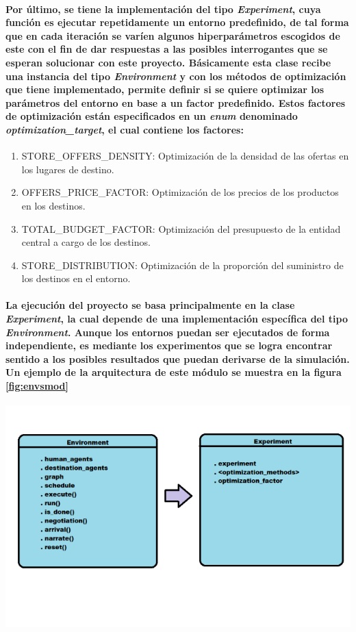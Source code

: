 \documentclass[12pt]{amsart}
\begin{document}
\paragraph{Por último, se tiene la implementación del tipo \textit{Experiment}, cuya función es ejecutar repetidamente un entorno predefinido, de tal forma que en cada iteración se varíen algunos hiperparámetros escogidos de este con el fin de dar respuestas a las posibles interrogantes que se esperan solucionar con este proyecto. Básicamente esta clase recibe una instancia del tipo \textit{Environment} y con los métodos de optimización que tiene implementado, permite definir si se quiere optimizar los parámetros del entorno en base a un factor predefinido. Estos factores de optimización están especificados en un \textit{enum} denominado \textit{optimization\_target}, el cual contiene los factores:} 
\begin {enumerate}
				\item {STORE\_OFFERS\_DENSITY: Optimización de la densidad de las ofertas en los lugares de destino.}
				\item {OFFERS\_PRICE\_FACTOR: Optimización de los precios de los productos en los destinos.}
				\item {TOTAL\_BUDGET\_FACTOR: Optimización del presupuesto de la entidad central a cargo de los destinos.}
				\item {STORE\_DISTRIBUTION: Optimización de la proporción del suministro de los destinos en el entorno.}
\end {enumerate}

\paragraph{La ejecución del proyecto se basa principalmente en la clase \textit{Experiment}, la cual depende de una implementación específica del tipo \textit{Environment}. Aunque los entornos puedan ser ejecutados de forma independiente, es mediante los experimentos que se logra encontrar sentido a los posibles resultados que puedan derivarse de la simulación. Un ejemplo de la arquitectura de este módulo se muestra en la figura \ref{fig:envsmod}}

\begin{center}
	\includegraphics[scale=0.8]{./images/envsmod.png}
	\label{fig:envsmod}
\end{center}
\end{document}
